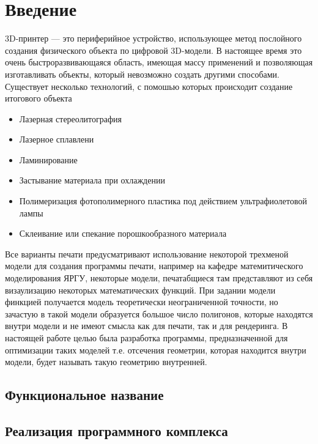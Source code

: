 \clearpage
\section{Введение}\label{intro}
3D-принтер — это периферийное устройство, использующее метод послойного создания физического объекта по цифровой 3D-модели. В настоящее время это очень быстроразвивающаяся область, имеющая массу применений и позволяющая изготавливать объекты, который невозможно создать другими способами. Существует несколько технологий, с помошью которых происходит создание итогового объекта

\begin{itemize}
\item Лазерная стереолитография\
\item Лазерное сплавлени
\item Ламинирование
\item Застывание материала при охлаждении
\item Полимеризация фотополимерного пластика под действием ультрафиолетовой лампы
\item Склеивание или спекание порошкообразного материала
\end{itemize}

Все варианты печати предусматривают использование некоторой трехменой модели для создания программы печати, например на кафедре матемитического моделирования ЯРГУ, некоторые модели, печатабщиеся там представляют из себя визаулизацию некоторых математических функций. При задании модели финкцией получается модель теоретически неограниченной точности, но зачастую в такой модели образуется большое число полигонов, которые находятся внутри модели и не имеют смысла как для печати, так и для рендеринга. В настоящей работе целью была разработка программы, предназначенной для оптимизации таких моделей т.е. отсечения геометрии, которая находится внутри модели, будет называть такую геометрию внутренней.

\subsection{Функциональное название}

\subsection{Реализация программного комплекса}
